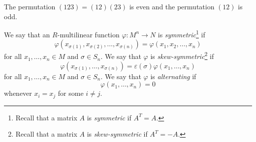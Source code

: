 \begin{example}
  The permutation
  $(123) = (12)(23)$ is even and the permutation
  $(12)$ is odd.
\end{example}

\begin{definition}
  We say that an $R$-multilinear function
  $\varphi : M^n \to N$
  is \emph{symmetric}\footnote{Recall that a matrix $A$ is \emph{symmetric} if $A^T = A$.} if
  \[
    \varphi(x_{\sigma(1)}, x_{\sigma(2)}, \dots, x_{\sigma(n)})
    = \varphi(x_1, x_2, \dots, x_n)
  \]
  for all $x_1, \dots, x_n \in M$ and
  $\sigma \in S_n$. We say that $\varphi$ is
  \emph{skew-symmetric}\footnote{Recall that a matrix $A$ is \emph{skew-symmetric} if $A^T = -A$.} if
  \[
    \varphi(x_{\sigma(1)}, \dots, x_{\sigma(n)})
    = \varepsilon(\sigma)\varphi(x_1, \dots, x_n)
  \]
  for all $x_1, \dots, x_n \in M$ and $\sigma \in S_n$.
  We say that $\varphi$ is \emph{alternating} if
  \[
    \varphi(x_1, \dots, x_n) = 0
  \]
  whenever $x_i = x_j$ for some $i \ne j$.
\end{definition}

